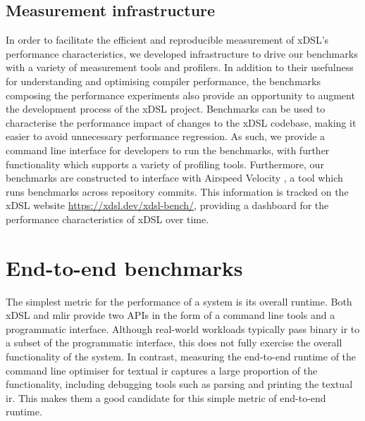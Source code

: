 \vspace{2em}


\subsection{Measurement infrastructure}
\label{ssec:infrastructure}

In order to facilitate the efficient and reproducible measurement of xDSL's performance characteristics, we developed infrastructure to drive our benchmarks with a variety of measurement tools and profilers.
In addition to their usefulness for understanding and optimising compiler performance, the benchmarks composing the performance experiments also provide an opportunity to augment the development process of the xDSL project.
Benchmarks can be used to characterise the performance impact of changes to the xDSL codebase, making it easier to avoid unnecessary performance regression.
As such, we provide a command line interface for developers to run the benchmarks, with further functionality which supports a variety of profiling tools.
Furthermore, our benchmarks are constructed to interface with Airspeed Velocity \cite{michaeldroettboomAirspeedvelocityAsv2025}, a tool which runs benchmarks across repository commits. This information is tracked on the xDSL website \url{https://xdsl.dev/xdsl-bench/}, providing a dashboard for the performance characteristics of xDSL over time.


















\section{End-to-end benchmarks}
\label{sec:e2e-benchmarks}

The simplest metric for the performance of a system is its overall runtime.
Both xDSL and \ac{mlir} provide two APIs in the form of a command line tools and a programmatic interface. Although real-world workloads typically pass binary \ac{ir} to a subset of the programmatic interface, this does not fully exercise the overall functionality of the system. In contrast, measuring the end-to-end runtime of the command line optimiser for textual \ac{ir} captures a large proportion of the functionality, including debugging tools such as parsing and printing the textual \ac{ir}.
This makes them a good candidate for this simple metric of end-to-end runtime.

